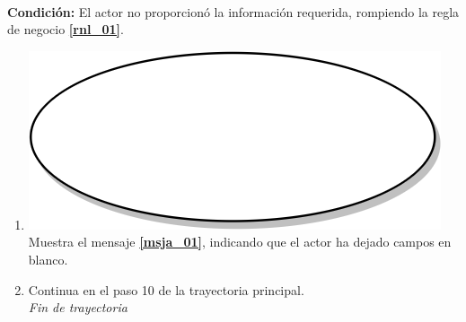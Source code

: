 \textbf{} \\
\textbf{Condición:} El actor no proporcionó la información requerida, rompiendo la regla de negocio \textbf{\ref{rnl_01}}.\\
 \begin{enumerate}[label=A\arabic*]
    \item {\includegraphics[scale=.05]{Capitulo3/img/proceso.png} Muestra el mensaje \textbf{\ref{msja_01}}, indicando que el actor ha dejado campos en blanco.}
    \item {Continua en el paso 10  de la trayectoria principal.} \\
    \textit{Fin de trayectoria} \\
\end{enumerate}
